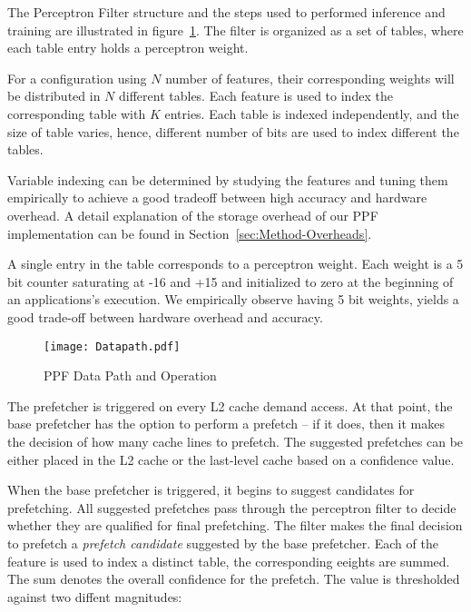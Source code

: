The Perceptron Filter structure and the steps used to performed inference 
and training are illustrated in figure~\ref{fig:PPF_Datapath}. 
The filter is organized as a set of tables, where each table entry holds a  
perceptron weight. 
 
For a configuration using $N$ number of features, 
their corresponding weights will be distributed
in $N$ different tables. Each feature is used to index 
the corresponding table with $K$ entries.  Each table is
indexed independently, and the size of table varies, hence, different
number of bits are used to index different the tables.


Variable indexing can be
determined by studying the features and tuning them empirically to
achieve a good tradeoff between high accuracy and hardware overhead.
A detail explanation of the storage overhead of
our PPF implementation can be found in
Section~\ref{sec:Method-Overheads}.

A single entry in the table corresponds to a perceptron weight.  Each weight
is a 5 bit counter saturating at -16 and +15 and initialized to zero at the
beginning of an applications's execution. We empirically observe having 5 bit weights,
yields a good trade-off between hardware overhead and accuracy.\newline

\begin{figure}
  \begin{center}
  \texttt{[image: Datapath.pdf]}
    \label{fig:PPF_Datapath}
  \caption{PPF Data Path and Operation}
  \end{center}
\end{figure}


\newline 

The prefetcher is triggered on every L2 cache
demand access.  At that point, the base prefetcher has the option to perform a
prefetch -- if it does, then it makes the decision of how many cache lines to
prefetch.  The suggested prefetches can be either placed in the L2 cache or
the last-level cache based on a confidence value.

When the base prefetcher is triggered, it begins to suggest candidates for
prefetching.  All suggested prefetches pass through the perceptron
filter to decide whether they are qualified for final prefetching. %
The filter makes the final decision to prefetch a \textit{prefetch candidate}
suggested by the base prefetcher.
Each of the feature is used to index a distinct table, 
the corresponding eeights are summed. The sum denotes the overall confidence for the prefetch. 
The value is thresholded against two diffent magnitudes:  

